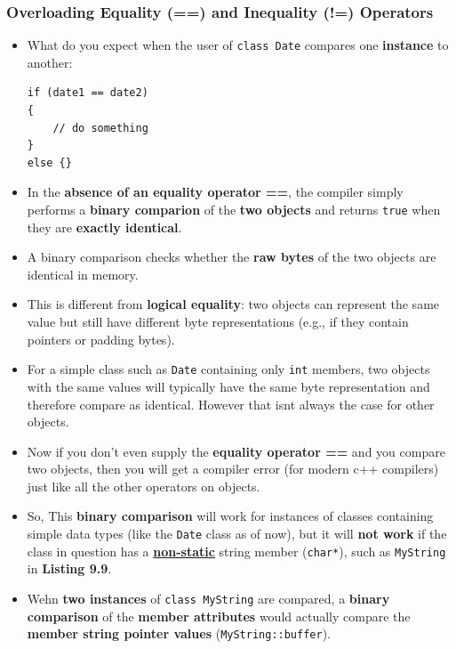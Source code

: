 \documentclass[10pt]{article}
\newcommand{\pbreak}{\vspace{30pt}}
\begin{document}
\newpage

\subsubsection{Overloading Equality (==) and Inequality (!=) Operators}
\begin{itemize}
	\item What do you expect when the user of \verb|class Date| compares one \textbf{instance} to another:
		\begin{verbatim}
if (date1 == date2)
{
	// do something
}
else {}
		\end{verbatim}

\item In the \textbf{absence of an equality operator ==}, the compiler simply performs a \textbf{binary comparion} of the \textbf{two objects} and returns \verb|true| when they are \textbf{exactly identical}.

	\item A binary comparison checks whether the \textbf{raw bytes} of the two objects are identical in memory.

	\item This is different from \textbf{logical equality}: two objects can represent the same value but still have different byte representations (e.g., if they contain pointers or padding bytes).

	\item For a simple class such as \verb|Date| containing only \verb|int| members, two objects with the same values will typically have the same byte representation and therefore compare as identical. However that isnt always the case for other objects.

	\item Now if you don't even supply the \textbf{equality operator ==} and you compare two objects, then you will get a compiler error (for modern c++ compilers) just like all the other operators on objects. 

		\pbreak

	\item So, This \textbf{binary comparison} will work for instances of classes containing simple data types (like the \verb|Date| class as of now), but it will \textbf{not work} if the class in question has a \textbf{\underline{non-static}} string member (\verb|char*|), such as \verb|MyString| in \textbf{Listing 9.9}.

	\item Wehn \textbf{two instances} of \verb|class MyString| are compared, a \textbf{binary comparison} of the \textbf{member attributes} would actually compare the \textbf{member string pointer values} (\verb|MyString::buffer|).


\end{itemize}
\end{document}

